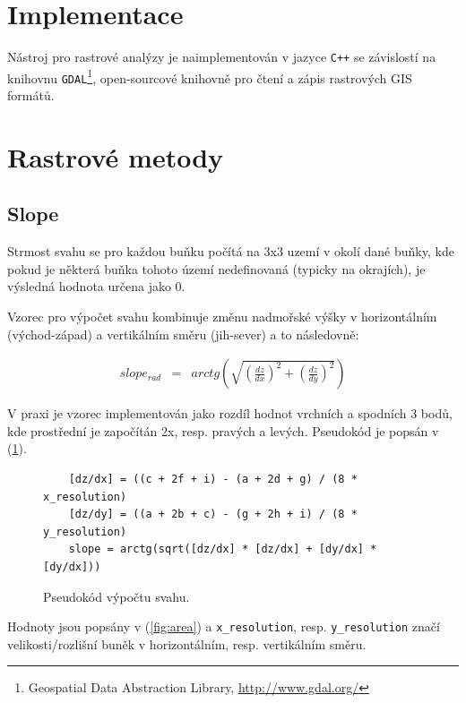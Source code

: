 \documentclass[12pt,a4paper,titlepage,final]{report}
\begin{document}
\section{Implementace}

Nástroj pro rastrové analýzy je naimplementován v jazyce \verb|C++| se závislostí na knihovnu \verb|GDAL|\footnote{Geospatial Data Abstraction Library, \url{http://www.gdal.org/}}, open-sourcové knihovně pro čtení a zápis rastrových GIS formátů.

\section{Rastrové metody}

\subsection{Slope}\label{subsec:slope}

Strmost svahu se pro každou buňku počítá na 3x3 uzemí v okolí dané buňky, kde pokud je některá buňka tohoto území nedefinovaná (typicky na okrajích), je výsledná hodnota určena jako 0.

Vzorec pro výpočet svahu kombinuje změnu nadmořské výšky v horizontálním (východ-západ) a vertikálním směru (jih-sever) a to následovně:

\begin{eqnarray}
	slope_{rad} &=& arctg(\sqrt{(\frac{dz}{dx})^2 + (\frac{dz}{dy})^2})
\end{eqnarray}

V praxi je vzorec implementován jako rozdíl hodnot vrchních a spodních 3 bodů, kde prostřední je započítán 2x, resp. pravých a levých. Pseudokód je popsán v (\ref{fig:pseudo}).

\begin{figure}[ht]
\begin{center}
\begin{verbatim}
	[dz/dx] = ((c + 2f + i) - (a + 2d + g) / (8 * x_resolution)
	[dz/dy] = ((a + 2b + c) - (g + 2h + i) / (8 * y_resolution)
	slope = arctg(sqrt([dz/dx] * [dz/dx] + [dy/dx] * [dy/dx]))
\end{verbatim}
\caption{Pseudokód výpočtu svahu.}
\label{fig:pseudo}
\end{center}
\end{figure}

Hodnoty jsou popsány v (\ref{fig:area}) a \verb|x_resolution|, resp. \verb|y_resolution| značí velikosti/rozlišní buněk v horizontálním, resp. vertikálním směru.
\end{document}
